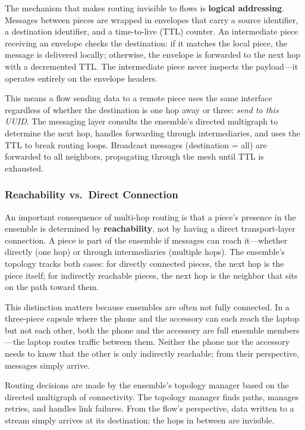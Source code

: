 \documentclass[11pt, letterpaper]{article}
\begin{document}
The mechanism that makes routing invisible to flows is \textbf{logical addressing}.
Messages between pieces are wrapped in envelopes that carry a source identifier, a
destination identifier, and a time-to-live (TTL) counter. An intermediate piece
receiving an envelope checks the destination: if it matches the local piece, the message
is delivered locally; otherwise, the envelope is forwarded to the next hop with a
decremented TTL. The intermediate piece never inspects the payload---it operates
entirely on the envelope headers.

This means a flow sending data to a remote piece uses the same interface regardless of
whether the destination is one hop away or three: \emph{send to this UUID}. The
messaging layer consults the ensemble's directed multigraph to determine the next hop,
handles forwarding through intermediaries, and uses the TTL to break routing loops.
Broadcast messages (destination = all) are forwarded to all neighbors, propagating
through the mesh until TTL is exhausted.

\subsubsection{Reachability vs.\ Direct Connection}

An important consequence of multi-hop routing is that a piece's presence in the ensemble
is determined by \textbf{reachability}, not by having a direct transport-layer connection.
A piece is part of the ensemble if messages can reach it---whether directly (one hop) or
through intermediaries (multiple hops). The ensemble's topology tracks both cases: for
directly connected pieces, the next hop is the piece itself; for indirectly reachable
pieces, the next hop is the neighbor that sits on the path toward them.

This distinction matters because ensembles are often not fully connected. In a
three-piece capsule where the phone and the accessory can each reach the laptop but not
each other, both the phone and the accessory are full ensemble members---the laptop
routes traffic between them. Neither the phone nor the accessory needs to know that
the other is only indirectly reachable; from their perspective, messages simply arrive.

Routing decisions are made by the ensemble's topology manager based on the directed
multigraph of connectivity. The topology manager finds paths, manages retries, and
handles link failures. From the flow's perspective, data written to a stream simply
arrives at its destination; the hops in between are invisible.
\end{document}

